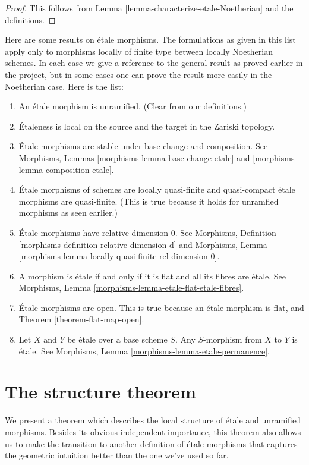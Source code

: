 \begin{proof}
This follows from Lemma \ref{lemma-characterize-etale-Noetherian}
and the definitions.
\end{proof}

\noindent
Here are some results on \'etale morphisms.
The formulations as given in this list apply only to
morphisms locally of finite type between locally Noetherian schemes.
In each case we give a reference to the general result as
proved earlier in the project, but in some cases one can
prove the result more easily in the Noetherian case.
Here is the list:
\begin{enumerate}
\item An \'etale morphism is unramified. (Clear from our definitions.)
\item \'Etaleness is local on the source and the target in the Zariski
topology.
\item \'Etale morphisms are stable under base change and composition.
See Morphisms, Lemmas \ref{morphisms-lemma-base-change-etale}
and \ref{morphisms-lemma-composition-etale}.
\item \'Etale morphisms of schemes are locally quasi-finite
and quasi-compact \'etale morphisms are quasi-finite. (This is
true because it holds for unramfied morphisms as seen earlier.)
\item \'Etale morphisms have relative dimension $0$. See
Morphisms, Definition \ref{morphisms-definition-relative-dimension-d}
and
Morphisms, Lemma \ref{morphisms-lemma-locally-quasi-finite-rel-dimension-0}.
\item A morphism is \'etale if and only if it is flat and
all its fibres are \'etale. See
Morphisms, Lemma \ref{morphisms-lemma-etale-flat-etale-fibres}.
\item \'Etale morphisms are open. This is true because an \'etale
morphism is flat, and Theorem \ref{theorem-flat-map-open}.
\item Let $X$ and $Y$ be \'etale over a base scheme $S$.
Any $S$-morphism from $X$ to $Y$ is \'etale.
See Morphisms, Lemma \ref{morphisms-lemma-etale-permanence}.
\end{enumerate}






\section{The structure theorem}
\label{section-structure-etale-map}

\noindent
We present a theorem which describes the local structure of \'etale
and unramified morphisms. Besides its obvious independent importance,
this theorem also allows us to make the transition to another
definition of \'etale morphisms that captures the geometric intuition better
than the one we've used so far.

